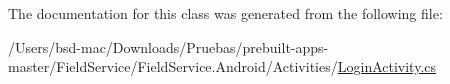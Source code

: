 The documentation for this class was generated from the following file\+:\begin{DoxyCompactItemize}
\item 
/\+Users/bsd-\/mac/\+Downloads/\+Pruebas/prebuilt-\/apps-\/master/\+Field\+Service/\+Field\+Service.\+Android/\+Activities/\hyperlink{_login_activity_8cs}{Login\+Activity.\+cs}\end{DoxyCompactItemize}
